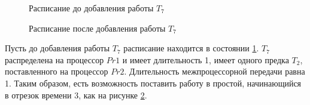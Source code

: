 \begin{figure}[!htbp]
    \caption{Расписание до добавления работы $T_7$}
    \label{fig:sched-before-addition}
\end{figure}
\begin{figure}[!htbp]
    \caption{Расписание после добавления работы $T_7$}
    \label{fig:sched-after-addition}
\end{figure}

Пусть до добавления работы $T_7$ расписание находится в состоянии \ref{fig:sched-before-addition}. $T_7$ распределена на процессор $Pr1$ и имеет длительность 1, имеет одного предка $T_2$, поставленного на процессор $Pr2$. Длительность межпроцессорной передачи равна 1. Таким образом, есть возможность поставить работу в простой, начинающийся в отрезок времени 3, как на рисунке \ref{fig:sched-after-addition}.
